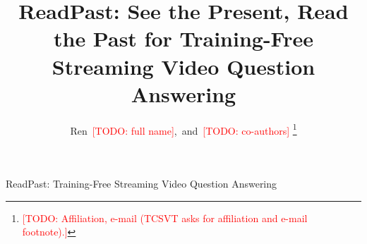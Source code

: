 \documentclass[journal]{IEEEtran}
\newcommand{\todo}[1]{\textcolor{red}{[TODO: #1]}}
\newcommand{\method}{ReadPast}
\begin{document}
\title{\method{}: See the Present, Read the Past for Training-Free Streaming Video Question Answering}

\author{Ren~\todo{full name},~and~\todo{co-authors}%
\thanks{\todo{Affiliation, e-mail (TCSVT asks for affiliation and e-mail footnote).}}}

%
{\method{}: Training-Free Streaming Video Question Answering}

\maketitle










\end{document}
